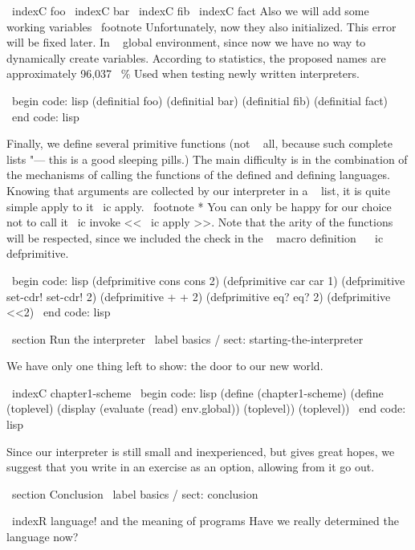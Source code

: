 {{\ indexC {foo} \ indexC {bar} \ indexC {fib} \ indexC {fact}
Also we will add some working variables \ footnote {Unfortunately, now they
also initialized. This error will be fixed later.} In ~ global
environment, since now we have no way to dynamically create variables.
According to statistics, the proposed names are approximately {96,037 \, \% }
Used when testing newly written interpreters.


\ begin {code: lisp}
(definitial foo)
(definitial bar)
(definitial fib)
(definitial fact)
\ end {code: lisp}


Finally, we define several primitive functions (not ~ all, because such
complete lists "--- this is a good sleeping pills.) The main difficulty is
in the combination of the mechanisms of calling the functions of the defined and defining languages.
Knowing that arguments are collected by our interpreter in a ~ list, it is quite simple
apply
to it \ ic {apply}. \ footnote * {You can only be happy for our choice not to call it
\ ic {invoke} << \ ic {apply} >>.} Note that the arity of the functions will be respected,
since we included the check in the ~ macro definition ~ \ ic {defprimitive}.

\ begin {code: lisp}
(defprimitive cons cons 2)
(defprimitive car car 1)
(defprimitive set-cdr! set-cdr! 2)
(defprimitive + + 2)
(defprimitive eq? eq? 2)
(defprimitive <<2)
\ end {code: lisp}


\ section {Run the interpreter} \ label {basics / sect: starting-the-interpreter}

We have only one thing left to show: the door to our new world.

\ indexC {chapter1-scheme}
\ begin {code: lisp}
(define (chapter1-scheme)
  (define (toplevel)
    (display (evaluate (read) env.global))
    (toplevel))
  (toplevel))
\ end {code: lisp}

Since our interpreter is still small and inexperienced, but gives great hopes,
we suggest that you write in an exercise as an option, allowing from it
go out.


\ section {Conclusion} \ label {basics / sect: conclusion}

\ indexR {language! and the meaning of programs}
Have we really determined the language now?

}}
